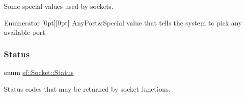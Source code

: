 Some special values used by sockets. 

\begin{DoxyVerb}\end{DoxyVerb}
 \begin{DoxyEnumFields}{Enumerator}
[0pt][0pt]{}\mbox{\label{classsf_1_1_socket_aa3e6c984bcb81a35234dcc9cc8369d75a5a3c30fd128895403afc11076f461b19}} 
Any\+Port&Special value that tells the system to pick any available port. \\
\hline

\end{DoxyEnumFields}
\mbox{\label{classsf_1_1_socket_a51bf0fd51057b98a10fbb866246176dc}} 
\subsubsection{\texorpdfstring{Status}{Status}}
{\footnotesize\ttfamily enum \mbox{\hyperlink{classsf_1_1_socket_a51bf0fd51057b98a10fbb866246176dc}{sf\+::\+Socket\+::\+Status}}}



Status codes that may be returned by socket functions. 

